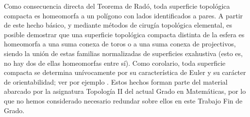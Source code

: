 \begin{remark} Como consecuencia directa del Teorema de Radó, toda superficie topológica compacta es homeomorfa a un polígono con lados identificados a pares. A partir de este hecho básico, y mediante métodos de cirugía topológica elemental, es posible demostrar que una superficie topológica compacta distinta de la esfera es homeomorfa a una suma conexa de toros o a una suma conexa de projectivos, siendo la unión de estas familias normalizadas de superficies exahustiva (esto es, no hay dos de ellas homeomorfas entre sí). Como corolario, toda superficie compacta se determina unívocamente por su característica de Euler y su carácter de orientabilidad; ver por ejemplo \cite{Massey77}. Estos hechos forman parte del material abarcado por la asignatura Topología II del actual Grado en Matemáticas, por lo que no hemos considerado necesario redundar sobre ellos en este Trabajo Fin de Grado.
\end{remark}